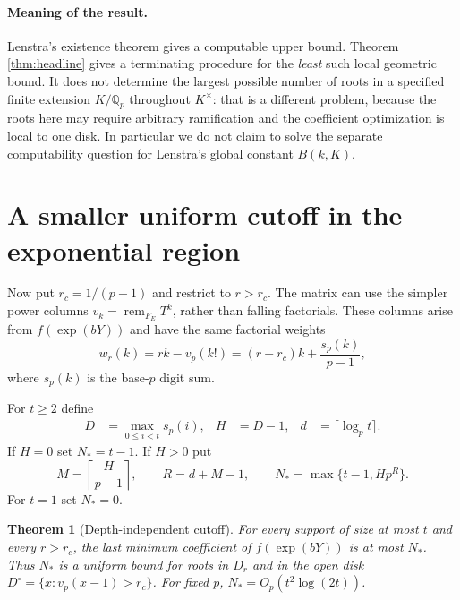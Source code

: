 \documentclass[11pt,letterpaper]{article}
\newtheorem{theorem}{Theorem}[section]
\theoremstyle{definition}\newtheorem{definition}[theorem]{Definition}
\theoremstyle{remark}\newtheorem{remark}[theorem]{Remark}
\newcommand{\Qp}{\mathbb Q_p}
\newcommand{\vp}{v_p}
\newcommand{\ds}{s_p}
\newcommand{\remn}{\operatorname{rem}}
\begin{document}
\paragraph{Meaning of the result.}
Lenstra's existence theorem gives a computable upper bound. Theorem
\ref{thm:headline} gives a terminating procedure for the \emph{least}
such local geometric bound. It does not determine the largest possible
number of roots in a specified finite extension $K/\Qp$ throughout
$K^\times$: that is a different problem, because the roots here may
require arbitrary ramification and the coefficient optimization is
local to one disk. In particular we do not claim to solve the separate
computability question for Lenstra's global constant $B(k,K)$.

\section{A smaller uniform cutoff in the exponential region}
Now put $r_c=1/(p-1)$ and restrict to $r>r_c$. The matrix can use the
simpler power columns $v_k=\remn_{F_E}T^k$, rather than falling
factorials. These columns arise from $f(\exp(bY))$ and have the same
factorial weights
\[
 w_r(k)=rk-\vp(k!)=(r-r_c)k+\frac{\ds(k)}{p-1},
\]
where $\ds(k)$ is the base-$p$ digit sum.

For $t\ge2$ define
\begin{align*}
 D&=\max_{0\le i<t}\ds(i),&H&=D-1,&d&=\lceil\log_p t\rceil.
\end{align*}
If $H=0$ set $N_*=t-1$. If $H>0$ put
\begin{equation}\label{eq:exp-cutoff}
 M=\left\lceil\frac H{p-1}\right\rceil,\qquad
 R=d+M-1,\qquad N_* =\max\{t-1,Hp^R\}.
\end{equation}
For $t=1$ set $N_*=0$.

\begin{theorem}[Depth-independent cutoff]\label{thm:exp-cutoff}
For every support of size at most $t$ and every $r>r_c$, the last
minimum coefficient of $f(\exp(bY))$ is at most $N_*$. Thus $N_*$ is
a uniform bound for roots in $D_r$ and in the open disk
$D^\circ=\{x:\vp(x-1)>r_c\}$. For fixed $p$,
$N_*=O_p(t^2\log(2t))$.
\end{theorem}
\end{document}
